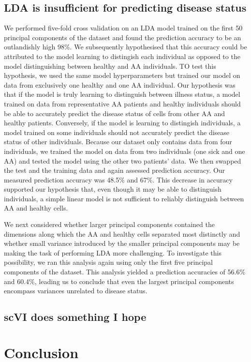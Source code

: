 \documentclass{article}
\begin{document}
\subsection{LDA is insufficient for predicting disease status}
We performed five-fold cross validation on an LDA model trained on the first 50 principal components of the dataset and found the prediction accuracy to be an outlandishly high 98\%.
We subsequently hypothesised that this accuracy could be attributed to the model learning to distingish each individual as opposed to the model distinguishing between healthy and AA individuals.
TO test this hypothesis, we used the same model hyperparameters but trained our model on data from exclusively one healthy and one AA individual.
Our hypothesis was that if the model is truly learning to distinguish between illness status, a model trained on data from representative AA patients and healthy individuals should be able to accurately predict the disease status of cells from other AA and healthy patients.
Conversely, if the model is learning to distingish individuals, a model trained on some individuals should not accurately predict the disease status of other individuals.
Because our dataset only contains data from four individuals, we trained the model on data from two individuals (one sick and one AA) and tested the model using the other two patients' data.
We then swapped the test and the training data and again assessed prediction accuracy.
Our measured prediction accuracy was 48.5\% and 67\%.
This decrease in accuracy supported our hypothesis that, even though it may be able to distinguish individuals, a simple linear model is not sufficient to reliably distinguish between AA and healthy cells.

We next considered whether larger principal components contained the dimensions along which the AA and healthy cells separated most distinctly and whether small variance introduced by the smaller principal components may be making the task of performing LDA more challenging.
To investigate this possibility, we ran this analysis again using only the first five principal components of the dataset.
This analysis yielded a prediction accuracies of 56.6\% and 60.4\%, leading us to conclude that even the largest principal components encompass variances unrelated to disease status.

\subsection*{scVI does something I hope}

\section{Conclusion}



{
\small
\printbibliography
}
\end{document}
